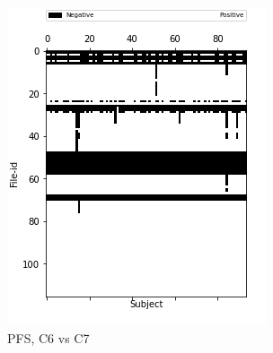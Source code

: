 \documentclass[10pt, conference, compsocconf]{IEEEtran}
\begin{document}
\begin{figure}[h!]
\begin{subfigure}[b]{0.45\linewidth}
        \includegraphics[width=\columnwidth]{data/Utility_Matrix/PreFreeSurfer/PFS_6v7_utility_matrix.png}
  \caption{PFS, C6 vs C7}
  \end{subfigure}
  \begin{subfigure}[b]{0.45\linewidth}

\end{subfigure}
\end{figure}
\end{document}
